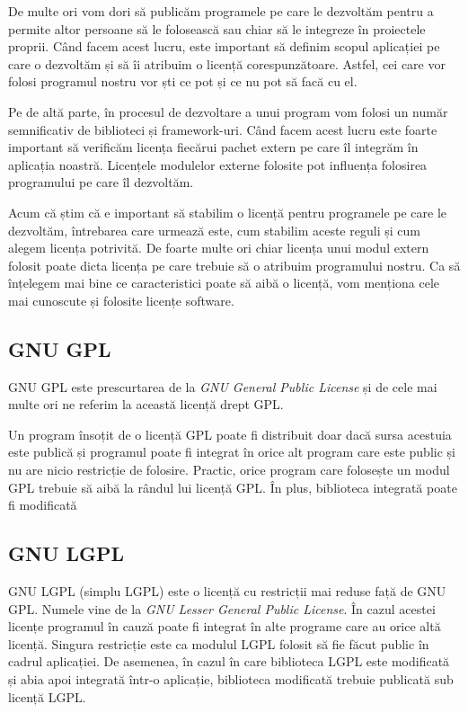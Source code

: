 De multe ori vom dori să publicăm programele pe care le dezvoltăm pentru a permite altor persoane să le folosească sau chiar să le integreze în proiectele proprii.
Când facem acest lucru, este important să definim scopul aplicației pe care o dezvoltăm și să îi atribuim o licență corespunzătoare.
Astfel, cei care vor folosi programul nostru vor ști ce pot și ce nu pot să facă cu el.

Pe de altă parte, în procesul de dezvoltare a unui program vom folosi un număr semnificativ de biblioteci și framework-uri.
Când facem acest lucru este foarte important să verificăm licența fiecărui pachet extern pe care îl integrăm în aplicația noastră.
Licențele modulelor externe folosite pot influența folosirea programului pe care îl dezvoltăm.

Acum că știm că e important să stabilim o licență pentru programele pe care le dezvoltăm, întrebarea care urmează este, cum stabilim aceste reguli și cum alegem licența potrivită.
De foarte multe ori chiar licența unui modul extern folosit poate dicta licența pe care trebuie să o atribuim programului nostru.
Ca să înțelegem mai bine ce caracteristici poate să aibă o licență, vom menționa cele mai cunoscute și folosite licențe software.

\subsection{GNU GPL}
\label{sec:appdev-licensing-gpl}

GNU GPL  este prescurtarea de la \textit{GNU General Public License} și de cele mai multe ori ne referim la această licență drept GPL.

Un program însoțit de o licență GPL poate fi distribuit doar dacă sursa acestuia este publică și programul poate fi integrat în orice alt program care este public și nu are nicio restricție de folosire.
Practic, orice program care folosește un modul GPL trebuie să aibă la rândul lui licență GPL.
În plus, biblioteca integrată poate fi modificată

\subsection{GNU LGPL}
\label{sec:appdev-licensing-lgpl}

GNU LGPL  (simplu LGPL) este o licență cu restricții mai reduse față de GNU GPL.
Numele vine de la \textit{GNU Lesser General Public License}.
În cazul acestei licențe programul în cauză poate fi integrat în alte programe care au orice altă licență.
Singura restricție este ca modulul LGPL folosit să fie făcut public în cadrul aplicației.
De asemenea, în cazul în care biblioteca LGPL este modificată și abia apoi integrată într-o aplicație, biblioteca modificată trebuie publicată sub licență LGPL.

